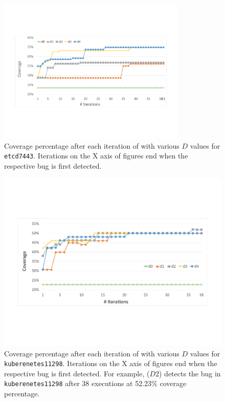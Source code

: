 \begin{figure}[]
   \centering
   \includegraphics[width=0.8\textwidth]{goat/figs/coverage_etcd7443.pdf}

   \caption{Coverage percentage after each iteration of \goat with various $D$ values for \texttt{etcd7443}. Iterations on the X axis of figures end when the respective bug is first detected.}
   \label{fig:etcd_coverage}
\end{figure}

\begin{figure}[]

       \centering
       \includegraphics[width=.8\textwidth]{goat/figs/coverage_kubernetes11298.pdf}

       \caption{Coverage percentage after each iteration of \goat with various $D$ values for \texttt{kuberenetes11298}. Iterations on the X axis of figures end when the respective bug is first detected. For example, \goat($D2$) detects the bug in \texttt{kuberenetes11298} after 38 executions at 52.23\% coverage percentage.}
       \label{fig:kubernetes_coverage}

\end{figure}
